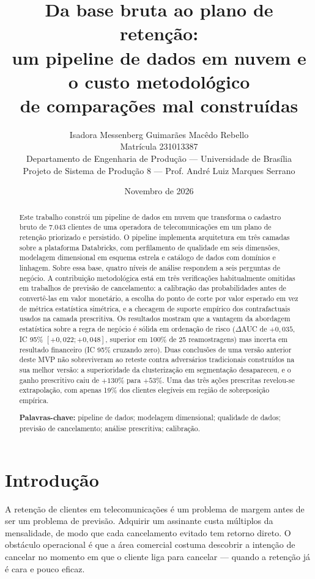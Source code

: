 \documentclass[10pt,a4paper]{article}
\title{\vspace{-1.2cm}\textbf{Da base bruta ao plano de retenção:\\
um pipeline de dados em nuvem e o custo metodológico\\
de comparações mal construídas}}
\author{
  Isadora Messenberg Guimarães Macêdo Rebello \\
  \small Matrícula 231013387 \\
  \small Departamento de Engenharia de Produção --- Universidade de Brasília \\
  \small Projeto de Sistema de Produção 8 --- Prof. André Luiz Marques Serrano
}
\date{\small Novembro de 2026}
\begin{document}
\maketitle

\begin{abstract}
\noindent
\small
Este trabalho constrói um pipeline de dados em nuvem que transforma o cadastro bruto de
7.043 clientes de uma operadora de telecomunicações em um plano de retenção priorizado e
persistido. O pipeline implementa arquitetura em três camadas sobre a plataforma
Databricks, com perfilamento de qualidade em seis dimensões, modelagem dimensional em
esquema estrela e catálogo de dados com domínios e linhagem. Sobre essa base, quatro
níveis de análise respondem a seis perguntas de negócio. A contribuição metodológica
está em três verificações habitualmente omitidas em trabalhos de previsão de
cancelamento: a calibração das probabilidades antes de convertê-las em valor monetário, a
escolha do ponto de corte por valor esperado em vez de métrica estatística simétrica, e a
checagem de suporte empírico dos contrafactuais usados na camada prescritiva. Os
resultados mostram que a vantagem da abordagem estatística sobre a regra de negócio é
sólida em ordenação de risco (\(\Delta\)AUC de \(+0{,}035\), IC 95\% \([+0{,}022;
+0{,}048]\), superior em 100\% de 25 reamostragens) mas incerta em resultado financeiro
(IC 95\% cruzando zero). Duas conclusões de uma versão anterior deste MVP não
sobreviveram ao reteste contra adversários tradicionais construídos na sua melhor versão:
a superioridade da clusterização em segmentação desapareceu, e o ganho prescritivo caiu
de \(+130\%\) para \(+53\%\). Uma das três ações prescritas revelou-se extrapolação, com
apenas 19\% dos clientes elegíveis em região de sobreposição empírica.

\vspace{4pt}
\noindent\textbf{Palavras-chave:} pipeline de dados; modelagem dimensional; qualidade de
dados; previsão de cancelamento; análise prescritiva; calibração.
\end{abstract}

\section{Introdução}

A retenção de clientes em telecomunicações é um problema de margem antes de ser um
problema de previsão. Adquirir um assinante custa múltiplos da mensalidade, de modo que
cada cancelamento evitado tem retorno direto. O obstáculo operacional é que a área
comercial costuma descobrir a intenção de cancelar no momento em que o cliente liga para
cancelar --- quando a retenção já é cara e pouco eficaz.
\end{document}
